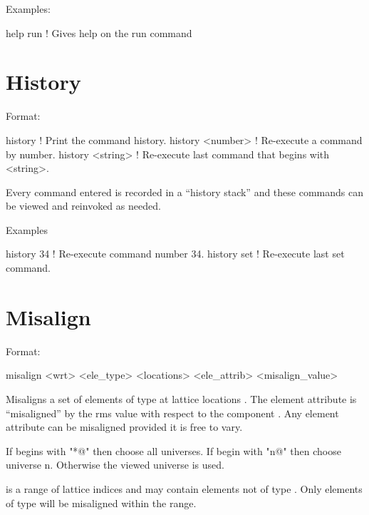Examples:
\begin{example}
  help run   ! Gives help on the run command
\end{example}

\section{History}
\label{s:history}

Format:
\begin{example}
  history           ! Print the command history.
  history <number>  ! Re-execute a command by number.
  history <string>  ! Re-execute last command that begins with <string>.
\end{example}

\vskip 0.2in
Every \tao command entered is recorded in a ``history stack'' and
these commands can be viewed and reinvoked as needed. 

Examples
\begin{example}
  history 34   ! Re-execute command number 34.
  history set  ! Re-execute last set command.  
\end{example}

\section{Misalign}
\label{s:misalign}

Format:
\begin{example}
   misalign <wrt> <ele_type> <locations> <ele_attrib> <misalign_value>
\end{example}

\vskip 0.2in
Misaligns a set of elements of type  at lattice locations .
The element attribute  is ``misaligned'' by the rms value
 with respect to the component . Any element
attribute can be misaligned provided it is free to vary.

If  begins with "*@" then choose all universes. If 
begin with "n@" then choose universe n. Otherwise the viewed universe is used.

 is a range of lattice indices and may contain elements not of
type . Only elements of type  will be misaligned
within the range.

